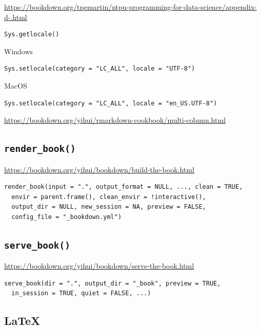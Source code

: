 \documentclass[
]{book}
\theoremstyle{definition}
\theoremstyle{definition}
\theoremstyle{definition}
\theoremstyle{definition}
\theoremstyle{remark}
\begin{document}
\url{https://bookdown.org/tpemartin/ntpu-programming-for-data-science/appendix-d-.html}

\begin{verbatim}
Sys.getlocale()
\end{verbatim}

Windows

\begin{verbatim}
Sys.setlocale(category = "LC_ALL", locale = "UTF-8")
\end{verbatim}

MacOS

\begin{verbatim}
Sys.setlocale(category = "LC_ALL", locale = "en_US.UTF-8")
\end{verbatim}

\url{https://bookdown.org/yihui/rmarkdown-cookbook/multi-column.html}

\hypertarget{render_book}{%
\subsection{\texorpdfstring{\texttt{render\_book()}}{render\_book()}}\label{render_book}}

\url{https://bookdown.org/yihui/bookdown/build-the-book.html}

\begin{verbatim}
render_book(input = ".", output_format = NULL, ..., clean = TRUE,
  envir = parent.frame(), clean_envir = !interactive(),
  output_dir = NULL, new_session = NA, preview = FALSE,
  config_file = "_bookdown.yml")
\end{verbatim}

\hypertarget{serve_book}{%
\subsection{\texorpdfstring{\texttt{serve\_book()}}{serve\_book()}}\label{serve_book}}

\url{https://bookdown.org/yihui/bookdown/serve-the-book.html}

\begin{verbatim}
serve_book(dir = ".", output_dir = "_book", preview = TRUE,
  in_session = TRUE, quiet = FALSE, ...)
\end{verbatim}

\hypertarget{latex-1}{%
\subsection{LaTeX}\label{latex-1}}
\end{document}
